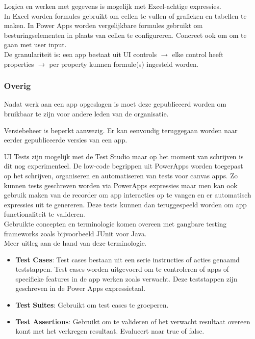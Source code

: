 Logica en werken met gegevens is mogelijk met Excel-achtige expressies.\\
In Excel worden formules gebruikt om cellen te vullen of grafieken en tabellen te maken. In Power Apps worden vergelijkbare formules gebruikt om besturingselementen in plaats van cellen te configureren. Concreet ook om om te gaan met user input.\\ 
De granulariteit is: een app bestaat uit UI controls $\rightarrow$ elke control heeft properties $\rightarrow$ per property kunnen formule(s) ingesteld worden. \autocite{MicrosoftDocs2019c}

\subsubsection{Overig}
\label{subsec:overig}

Nadat werk aan een app opgeslagen is moet deze gepubliceerd worden om bruikbaar te zijn voor andere leden van de organisatie.

Versiebeheer is beperkt aanwezig. Er kan eenvoudig teruggegaan worden naar eerder gepubliceerde versies van een app.

UI Tests zijn mogelijk met de Test Studio maar op het moment van schrijven is dit nog experimenteel. De low-code begrippen uit PowerApps worden toegepast op het schrijven, organiseren en automatiseren van tests voor canvas apps. Zo kunnen tests geschreven worden via PowerApps expressies maar men kan ook gebruik maken van de recorder om app interacties op te vangen en er automatisch expressies uit te genereren. Deze tests kunnen dan teruggespeeld worden om app functionaliteit te valideren. \\ 
Gebruikte concepten en terminologie komen overeen met gangbare testing frameworks zoals bijvoorbeeld JUnit voor Java. \\
Meer uitleg aan de hand van deze terminologie. 
\begin{itemize}
    \item \textbf{Test Cases}: Test cases bestaan uit een serie instructies of acties genaamd teststappen. Test cases worden uitgevoerd om te controleren of apps of specifieke features in de app werken zoals verwacht. Deze teststappen zijn geschreven in de Power Apps expressietaal.
    \item \textbf{Test Suites}: Gebruikt om test cases te groeperen.
    \item \textbf{Test Assertions}: Gebruikt om te valideren of het verwacht resultaat overeen komt met het verkregen resultaat. Evalueert naar true of false.
\end{itemize}
\autocite{MicrosoftDocs2019d}


